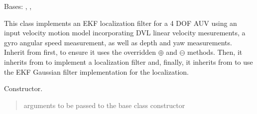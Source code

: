 \documentclass[letterpaper,10pt,english]{sphinxmanual}
\begin{document}
\begin{fulllineitems}
\label{\detokenize{GFLocalization:EKF_3DOFDifferentialDriveInputDisplacement.EKF_3DOFDifferentialDriveInputDisplacement}}
\pysigstartsignatures
{}
\pysigstopsignatures
\sphinxAtStartPar
Bases: {\hyperref[\detokenize{GFLocalization:GFLocalization.GFLocalization}]{}}, {\hyperref[\detokenize{DRLocalization:DR_3DOFDifferentialDrive.DR_3DOFDifferentialDrive}]{}}, {\hyperref[\detokenize{EKF:EKF.EKF}]{}}

\sphinxAtStartPar
This class implements an EKF localization filter for a 4 DOF AUV using an input velocity motion model  incorporating
DVL linear velocity mesurements, a gyro angular speed measurement, as well as  depth and yaw measurements.
Inherit from  first, to ensure it uses the overridden \(\oplus\) and \(\ominus\) methods.
Then, it inherits from  to implement a localization filter and, finally, it inherits from
 to use the EKF Gaussian filter implementation for the localization.

\begin{fulllineitems}
\label{\detokenize{GFLocalization:EKF_3DOFDifferentialDriveInputDisplacement.EKF_3DOFDifferentialDriveInputDisplacement.__init__}}
\pysigstartsignatures
{}
\pysigstopsignatures
\sphinxAtStartPar
Constructor.
\begin{quote}\begin{description}
\sphinxAtStartPar
{} \textendash{} arguments to be passed to the base class constructor


\end{description}
\end{quote}
\end{fulllineitems}
\end{fulllineitems}
\end{document}
